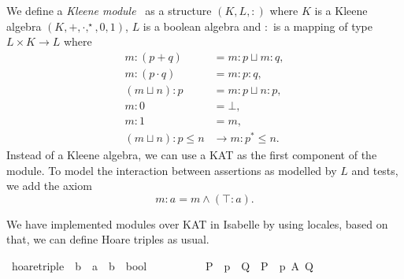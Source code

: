 \documentclass{llncs}
\begin{document}
We define a \emph{Kleene module}~\cite{KM} as a structure
$(K,L,:)$ where $K$ is a Kleene algebra
$(K,+,\cdot,^\star,0,1)$, $L$ is a boolean algebra and $:$
is a mapping of type $L \times K \to L$ where
\begin{align*}
  m : (p + q) &= m : p \sqcup m : q,\\
  m : (p \cdot q) &= m : p : q,\\
  (m \sqcup n) : p &= m : p \sqcup n : p,\\
  m : 0 &= \bot,\\
  m : 1 &= m,\\
  (m \sqcup n) : p \le n &\longrightarrow m : p^\ast \le n.
\end{align*}
Instead of a Kleene algebra, we can use a KAT as the first component
of the module. To model the interaction between assertions as modelled
by $L$ and tests, we add the axiom
\begin{equation*}
  m : a = m \wedge (\top : a).
\end{equation*}

We have implemented modules over KAT in Isabelle by using locales,
based on that, we can define Hoare triples as usual.

\begin{isabellebody}
\isanewline
{}\isamarkupfalse%
\ hoare{}triple\ {}{}\ {}{}b\ {}\ {}a\ {}\ {}b\ {}\ bool{}\ {}{}{}\ {}\ {}\ {}\ {}{}\ {}{}{}{}{}{}{}{}{}{}\ {}{}{}\ \isanewline
\ \ {}P\ {}\ p\ {}\ Q\ {}\ P\ {}\ p\ {}\isactrlbsub A\isactrlesub \ Q{}\isanewline
\end{isabellebody}
\end{document}
